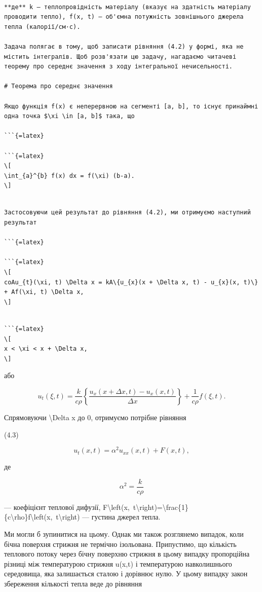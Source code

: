 \documentclass[
]{article}
\begin{document}
\begin{verbatim}

**де** k — теплопровідність матеріалу (вказує на здатність матеріалу проводити тепло), f(x, t) — об'ємна потужність зовнішнього джерела тепла (калорії/см·с).

Задача полягає в тому, щоб записати рівняння (4.2) у формі, яка не містить інтегралів. Щоб розв'язати цю задачу, нагадаємо читачеві теорему про середнє значення з ходу інтегральної нечисельності.

# Теорема про середнє значення

Якщо функція f(x) є неперервною на сегменті [a, b], то існує принаймні одна точка $\xi \in [a, b]$ така, що

```{=latex}

```{=latex}
\[
\int_{a}^{b} f(x) dx = f(\xi) (b-a).
\]
\end{verbatim}

\begin{verbatim}

Застосовуючи цей результат до рівняння (4.2), ми отримуємо наступний результат

```{=latex}

```{=latex}
\[
coAu_{t}(\xi, t) \Delta x = kA\{u_{x}(x + \Delta x, t) - u_{x}(x, t)\} + Af(\xi, t) \Delta x,
\]
\end{verbatim}

\begin{verbatim}

```{=latex}
\[
x < \xi < x + \Delta x,
\]
\end{verbatim}

або

\[
u_t(\xi, t) = \frac{k}{c\rho} \left\{ \frac{u_x(x + \Delta x, t) - u_x(x, t)}{\Delta x} \right\} + \frac{1}{c\rho} f(\xi, t).
\]

Спрямовуючи \textbackslash Delta x до 0, отримуємо потрібне рівняння

(4.3)

\[
u_t(x, t) = \alpha^2 u_{xx}(x, t) + F(x, t),
\]

де

\[
\alpha^{2}=\frac{k}{c\rho}
\]

--- коефіцієнт теплової дифузії,
F\textbackslash left(x,~t\textbackslash right)=\textbackslash frac\{1\}\{c\textbackslash rho\}f\textbackslash left(x,~t\textbackslash right)
--- густина джерел тепла.

Ми могли б зупинитися на цьому. Однак ми також розглянемо випадок, коли
бічна поверхня стрижня не термічно ізольована. Припустимо, що кількість
теплового потоку через бічну поверхню стрижня в цьому випадку
пропорційна різниці між температурою стрижня u(x,t) і температурою
навколишнього середовища, яка залишається сталою і дорівнює нулю. У
цьому випадку закон збереження кількості тепла веде до рівняння
\end{document}
